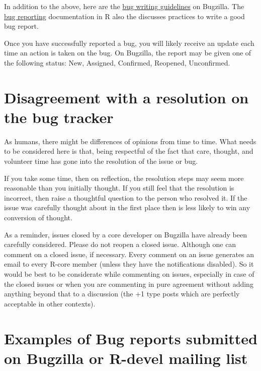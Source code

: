 \documentclass[
]{book}
\begin{document}
In addition to the above, here are the \href{https://bugs.r-project.org/bugzilla/page.cgi?id=bug-writing.html}{bug writing guidelines} on Bugzilla. The \href{https://www.r-project.org/bugs.html\#writing-a-good-bug-report}{bug reporting} documentation in R also the discusses practices to write a good bug report.

Once you have successfully reported a bug, you will likely receive an update each time an action is taken on the bug. On Bugzilla, the report may be given one of the following status: New, Assigned, Confirmed, Reopened, Unconfirmed.

\hypertarget{disagreement-with-a-resolution-on-the-bug-tracker}{%
\section{Disagreement with a resolution on the bug tracker}\label{disagreement-with-a-resolution-on-the-bug-tracker}}

As humans, there might be differences of opinions from time to time. What needs to be considered here is that, being respectful of the fact that care, thought, and volunteer time has gone into the resolution of the issue or bug.

If you take some time, then on reflection, the resolution steps may seem more reasonable than you initially thought. If you still feel that the resolution is incorrect, then raise a thoughtful question to the person who resolved it. If the issue was carefully thought about in the first place then is less likely to win any conversion of thought.

As a reminder, issues closed by a core developer on Bugzilla have already been carefully considered. Please do not reopen a closed issue. Although one can comment on a closed issue, if necessary. Every comment on an issue generates an email to every R-core member (unless they have the notifications disabled). So it would be best to be considerate while commenting on issues, especially in case of the closed issues or when you are commenting in pure agreement without adding anything beyond that to a discussion (the +1 type posts which are perfectly acceptable in other contexts).

\hypertarget{examples-of-bug-reports-submitted-on-bugzilla-or-r-devel-mailing-list}{%
\section{Examples of Bug reports submitted on Bugzilla or R-devel mailing list}\label{examples-of-bug-reports-submitted-on-bugzilla-or-r-devel-mailing-list}}
\end{document}

